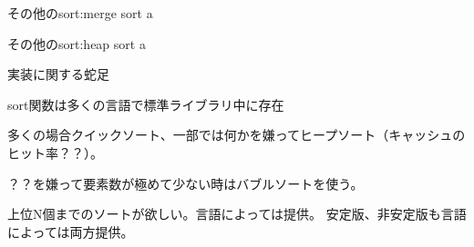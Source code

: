 \documentclass{beamer}
\begin{document}
\begin{frame}[fragile]{その他のsort:merge sort}{}
a
\end{frame}

\begin{frame}[fragile]{その他のsort:heap sort}{}
a
\end{frame}

\begin{frame}[fragile]{実装に関する蛇足}{}

sort関数は多くの言語で標準ライブラリ中に存在

多くの場合クイックソート、一部では何かを嫌ってヒープソート（キャッシュのヒット率？？）。

？？を嫌って要素数が極めて少ない時はバブルソートを使う。

上位N個までのソートが欲しい。言語によっては提供。
安定版、非安定版も言語によっては両方提供。

\end{frame}
\end{document}
